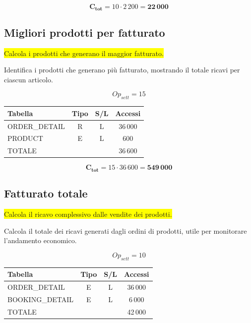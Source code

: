 \documentclass[a4paper,12pt]{report}
\begin{document}
$$\mathbf{C_{tot}} = 10 \cdot 2\,200 = \mathbf{22\,000}$$

\subsection*{Migliori prodotti per fatturato} \label{op4}
\colorbox{yellow}{Calcola i prodotti che generano il maggior fatturato.}

Identifica i prodotti che generano più fatturato, mostrando il totale
ricavi per ciascun articolo.

$$Op_{sett} = 15$$

\begin{table}[H]
  \centering
  \small
  \renewcommand{\arraystretch}{1.15}
  \begin{tabularx}{0.7\textwidth}{|X|c|c|c|}
    \hline
    \rowcolor{gray!20}
    \textbf{Tabella} & \textbf{Tipo} & \textbf{S/L} & \textbf{Accessi} \\
    \hline
    ORDER\_DETAIL & R & L & 36\,000 \\
    PRODUCT & E & L & 600 \\
    \hline
    \rowcolor{gray!20}
    TOTALE & & & 36\,600\\
    \hline
  \end{tabularx}
  \vspace{-1em}
\end{table}

$$\mathbf{C_{tot}} = 15 \cdot 36\,600 = \mathbf{549\,000}$$

\subsection*{Fatturato totale} \label{op5}

\colorbox{yellow}{Calcola il ricavo complessivo dalle vendite dei prodotti.}

Calcola il totale dei ricavi generati dagli ordini di prodotti, utile
per monitorare l'andamento economico.

$$Op_{sett} = 10$$

\begin{table}[H]
  \centering
  \small
  \renewcommand{\arraystretch}{1.15}
  \begin{tabularx}{0.7\textwidth}{|X|c|c|c|}
    \hline
    \rowcolor{gray!20}
    \textbf{Tabella} & \textbf{Tipo} & \textbf{S/L} & \textbf{Accessi} \\
    \hline
    ORDER\_DETAIL & E & L & 36\,000 \\
    BOOKING\_DETAIL & E & L & 6\,000 \\
    \hline
    \rowcolor{gray!20}
    TOTALE & & & 42\,000 \\
    \hline
  \end{tabularx}
  \vspace{-1em}
\end{table}
\end{document}
